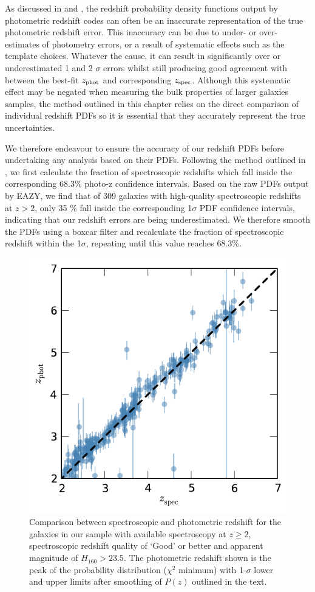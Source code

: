 As discussed in \citet{Hildebrandt:2008jh} and \citet{Dahlen:2013eu}, the redshift probability density functions output by photometric redshift codes can often be an inaccurate representation of the true photometric redshift error. This inaccuracy can be due to under- or over-estimates of photometry errors, or a result of systematic effects such as the template choices. Whatever the cause, it can result in significantly over or underestimated 1 and 2 $\sigma$ errors whilst still producing good agreement with between the best-fit $z_{\rm{phot}}$ and corresponding $z_{\rm{spec}}$. Although this systematic effect may be negated when measuring the bulk properties of larger galaxies samples, the method outlined in this chapter relies on the direct comparison of individual redshift PDFs so it is essential that they accurately represent the true uncertainties.

We therefore endeavour to ensure the accuracy of our redshift PDFs before undertaking any analysis based on their PDFs. Following the method outlined in \citet{Dahlen:2013eu}, we first calculate the fraction of spectroscopic redshifts which fall inside the corresponding 68.3\% photo-z confidence intervals. Based on the raw PDFs output by EAZY, we find that of 309 galaxies with high-quality spectroscopic redshifts at $z > 2$, only 35 \% fall inside the corresponding 1$\sigma$ PDF confidence intervals, indicating that our redshift errors are being underestimated. We therefore smooth the PDFs using a boxcar filter and recalculate the fraction of spectroscopic redshift within the 1$\sigma$, repeating until this value reaches 68.3\%.

\begin{figure}
\centering
\includegraphics[width=0.75\columnwidth]{plots/specz_comparison.pdf}  
  \caption[Comparison between spectroscopic and photometric redshift for the galaxies in our sample.]{Comparison between spectroscopic and photometric redshift for the galaxies in our sample with available spectroscopy at $z \geq 2$, spectroscopic redshift quality of `Good' or better and apparent magnitude of $H_{160} > 23.5$. The photometric redshift shown is the peak of the probability distribution ($\chi^2$ minimum) with 1-$\sigma$ lower and upper limits after smoothing of $P(z)$ outlined in the text.}
  \label{fig:specz_comp1}
\end{figure}

